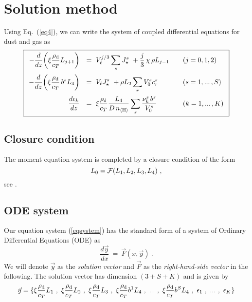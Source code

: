 \documentclass[11pt]{article}
\def\nH{n_{\langle\rm H\rangle}}
\def\Vl{V_{\ell}}
\def\rhod{\rho_{\rm d}}
\def\ek{\epsilon_k}
\begin{document}
\clearpage
\section{Solution method}

Using Eq.~(\ref{eq4}), we can write the system of coupled
differential equations for dust and gas as
\begin{equation}
\boxed{\begin{array}{rll}
  \displaystyle
  -\frac{d}{dz}\!\left(\xi\frac{\rhod}{c_T}L_{j+1}\right) 
  &=~\displaystyle
       \Vl^{j/3} \sum\limits_s J_\star^s
    ~+ \frac{j}{3}\,\chi\,\rho L_{j-1}
  &\quad(j=0,1,2)\\[5mm]
  \displaystyle
  -\frac{d}{dz}\!\left(\xi\frac{\rhod}{c_T}\,b^s L_4\right) 
  &=~\displaystyle
     \Vl J_\star^s 
    ~+ \rho L_2 \sum\limits_r V_0^s c_r^s
  &\quad(s=1,...\,,S)\\[5mm]
  \displaystyle
  -\frac{d\ek}{dz} 
  &=~\displaystyle
     \xi\frac{\rhod}{c_T}\frac{L_4}{D\,\nH} 
     \sum\limits_s\frac{\nu_k^s\,b^s}{V_0^s}
  &\quad(k=1,...\,,K) 
\end{array}}
\label{eqsystem}
\end{equation}

\subsection{Closure condition}

The moment equation system is completed by a closure condition of the form
\begin{equation}
  L_0 = {\cal F}(L_1,L_2,L_3,L_4)     \ ,
\end{equation}
see \citet[][section 2.4.1]{Woitke2004}.

\subsection{ODE system}

Our equation system (\ref{eqsystem}) has the standard form of a system
of Ordinary Differential Equations (ODE) as 
\begin{equation}
  \frac{d\vec{y}}{dx} ~=~ \vec{F}(x,\vec{y}) \ .
\end{equation}
We will denote $\vec{y}$ as the {\sl solution vector} and $\vec{F}$ as the
{\sl right-hand-side vector} in the following. The solution vector has
dimension $(3+S+K)$ and is given by
\begin{equation}
  \vec{y} = \{\xi\frac{\rhod}{c_T}L_1\ ,\ 
              \xi\frac{\rhod}{c_T}L_2\ ,\ 
              \xi\frac{\rhod}{c_T}L_3\ ,\ 
              \xi\frac{\rhod}{c_T}b^1 L_4\ ,\ ...\ , \ 
              \xi\frac{\rhod}{c_T}b^S L_4\ ,\ 
              \epsilon_1\ ,\ ...\ , \  
              \epsilon_K
            \} 
\end{equation}
\end{document}
